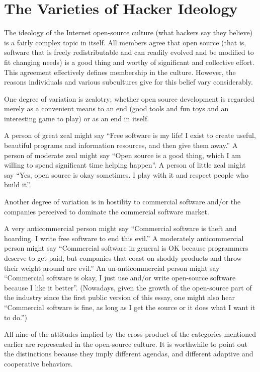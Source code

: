 \section{The Varieties of Hacker Ideology}

The ideology of the Internet open-source culture (what hackers say they believe)
is a fairly complex topic in itself.  All members agree that open source (that
is, software that is freely redistributable and can readily evolved and be
modified to fit changing needs) is a good thing and worthy of significant and
collective effort.  This agreement effectively defines membership in the
culture.  However, the reasons individuals and various subcultures give for this
belief vary considerably.

One degree of variation is zealotry; whether open source development is regarded
merely as a convenient means to an end (good tools and fun toys and an
interesting game to play) or as an end in itself.

A person of great zeal might say ``Free software is my life! I exist to create
useful, beautiful programs and information resources, and then give them away.''
A person of moderate zeal might say ``Open source is a good thing, which I am
willing to spend significant time helping happen''.  A person of little zeal
might say ``Yes, open source is okay sometimes.  I play with it and respect
people who build it''.

Another degree of variation is in hostility to commercial software and/or the
companies perceived to dominate the commercial software market.

A very anticommercial person might say ``Commercial software is theft and
hoarding.  I write free software to end this evil.'' A moderately anticommercial
person might say ``Commercial software in general is OK because programmers
deserve to get paid, but companies that coast on shoddy products and throw their
weight around are evil.'' An un-anticommercial person might say ``Commercial
software is okay, I just use and/or write open-source software because I like it
better''.  (Nowadays, given the growth of the open-source part of the industry
since the first public version of this essay, one might also hear ``Commercial
software is fine, as long as I get the source or it does what I want it to
do.'')

All nine of the attitudes implied by the cross-product of the categories
mentioned earlier are represented in the open-source culture.  It is worthwhile
to point out the distinctions because they imply different agendas, and
different adaptive and cooperative behaviors.

